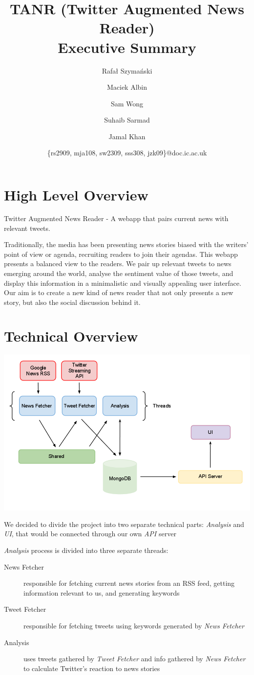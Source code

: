 \documentclass[a4paper]{article}
\title{TANR (Twitter Augmented News Reader)\\Executive Summary\\}
\author{
    \small{Rafał Szymański}\\
  	\and
    \small{Maciek Albin}\\
    \and
    \small{Sam Wong}\\
    \and  
    \small{Suhaib Sarmad}\\
		\and
		\small{Jamal Khan}\\
		\and
		\small{\{rs2909, mja108, sw2309, sss308, jzk09\}@doc.ic.ac.uk}
		\and
}
\date{}
\begin{document}
 
	\maketitle
	
  \section{High Level Overview}
  
  Twitter Augmented News Reader - A webapp that pairs current news with relevant tweets.
  
  Traditionally, the media has been presenting news stories biased with the writers’ point of view or agenda, recruiting readers to join their agendas. This webapp presents a balanced view to the readers. We pair up relevant tweets to news emerging around the world, analyse the sentiment value of those tweets, and display this information in a minimalistic and visually appealing user interface. Our aim is to create a new kind of news reader that not only presents a new story, but also the social discussion behind it.
  
  \section{Technical Overview}
  
  \begin{center}
	 \includegraphics[scale=0.35]{infrastructure.png}
  \end{center}
	 
	 	We decided to divide the project into two separate technical parts: \emph{Analysis} and \emph{UI}, that would be connected through our own \emph{API} server
	 	
	 	\emph{Analysis} process is divided into three separate threads:
  	\begin{description}
  	 \item[News Fetcher] responsible for fetching current news stories from an RSS feed, getting information relevant to us, and generating keywords
  	 \item[Tweet Fetcher] responsible for fetching tweets using keywords generated by \emph{News Fetcher}
  	 \item[Analysis] uses tweets gathered by \emph{Tweet Fetcher} and info gathered by \emph{News Fetcher} to calculate Twitter's reaction to news stories
  	\end{description}
	 
\end{document}

